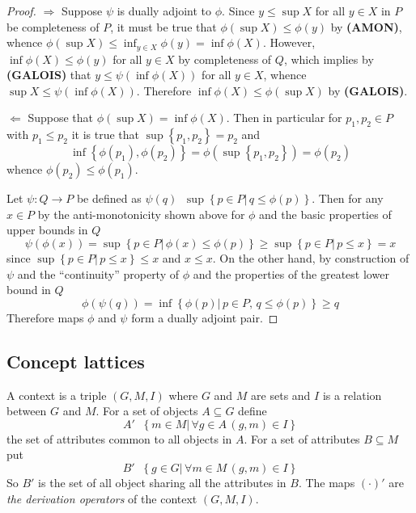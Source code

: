 \documentclass[a4paper]{article}
\newcommand{\obj}[1]{{\left\{ #1 \right \}}}
\newcommand{\brac}[1]{{\left ( #1 \right )}}
\newcommand{\induc}[1]{{\left . #1 \right \vert}}
\newcommand{\defn}{\mathop{\overset{\Delta}{=}}\nolimits}
\begin{document}
\begin{proof}
$\Rightarrow$ Suppose $\psi$ is dually adjoint to $\phi$. Since $y\leq \sup X$ for all $y\in X$ in $P$ be completeness of $P$, it must be true that $\phi\brac{\sup X}\leq \phi(y)$ by \textbf{(AMON)}, whence $\phi\brac{\sup X}\leq \inf_{y\in X} \phi(y) = \inf \phi(X)$. However, $\inf \phi(X)\leq \phi(y)$ for all $y\in X$ by completeness of $Q$, which implies by \textbf{(GALOIS)} that $y\leq \psi\brac{\inf \phi(X)}$ for all $y\in X$, whence $\sup X\leq \psi\brac{\inf \phi(X)}$. Therefore $\inf\phi(X)\leq \phi\brac{\sup X}$ by \textbf{(GALOIS)}.

$\Leftarrow$ Suppose that $\phi\brac{\sup X} = \inf \phi(X)$. Then in particular for $p_1,p_2\in P$ with $p_1\leq p_2$ it is true that $\sup\obj{p_1,p_2} = p_2$ and \[\inf\obj{\phi(p_1),\phi(p_2)} = \phi\brac{\sup\obj{p_1,p_2}} = \phi(p_2)\] whence $\phi(p_2)\leq \phi(p_1)$.

Let $\psi:Q\to P$ be defined as $\psi(q) \defn \sup\obj{\induc{p\in P}\,q\leq \phi(p)}$. Then for any $x\in P$ by the anti-monotonicity shown above for $\phi$ and the basic properties of upper bounds in $Q$ \[\psi\brac{\phi(x)} = \sup\obj{\induc{p\in P}\,\phi(x)\leq \phi(p)} \geq \sup\obj{\induc{p\in P}\,p\leq x} = x\] since $\sup\obj{\induc{p\in P}\,p\leq x}\leq x$ and $x\leq x$. On the other hand, by construction of $\psi$ and the ``continuity'' property of $\phi$ and the properties of the greatest lower bound in $Q$ \[\phi\brac{\psi(q)} = \inf\obj{\induc{\phi(p)}\,p\in P,\,q\leq \phi(p)} \geq q\] Therefore maps $\phi$ and $\psi$ form a dually adjoint pair.
\end{proof}


\subsection{Concept lattices} %
\label{sub:concept_lattices}

A context is a triple $(G,M,I)$ where $G$ and $M$ are sets and $I$ is a relation between $G$ and $M$. For a set of objects $A\subseteq G$ define \[A'\defn \obj{\induc{m\in M}\,\forall g\in A\,(g,m)\in I}\] the set of attributes common to all objects in $A$. For a set of attributes $B\subseteq M$ put \[B'\defn \obj{\induc{g\in G}\,\forall m\in M\,(g,m)\in I}\] So $B'$ is the set of all object sharing all the attributes in $B$. The maps ${(\cdot)}'$ are \emph{the derivation operators} of the context $(G,M,I)$.
\end{document}
